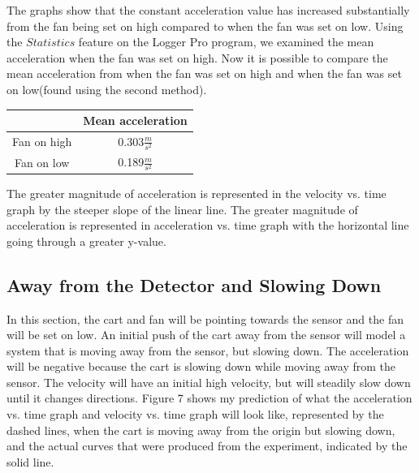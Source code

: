 \documentclass[aps,letterpaper,11pt]{revtex4}
\begin{document}
\newpage 

The graphs show that the constant acceleration value has increased substantially from the fan being set on high compared to when the fan was set on low. Using the $Statistics$ feature on the Logger Pro program, we examined the mean acceleration when the fan was set on high. Now it is possible to compare the mean acceleration from when the fan was set on high and when the fan was set on low(found using the second method).

\vspace{10mm}

\begin{center}
\begin{tabular}{|c|c|}
\hline
  & Mean acceleration\\
\hline
Fan on high & 0.303$\frac{m}{s^2}$\\
\hline
Fan on low & 0.189$\frac{m}{s^2}$\\
\hline  
\end{tabular}
\end{center}

\vspace{10mm}

The greater magnitude of acceleration is represented in the velocity vs. time graph by the steeper slope of the linear line. The greater magnitude of acceleration is represented in acceleration vs. time graph with the horizontal line going through a greater y-value.

\vspace{10mm
}
\subsection{Away from the Detector and Slowing Down} 

In this section, the cart and fan will be pointing towards the sensor and the fan will be set on low. An initial push of the cart away from the sensor will model a system that is moving away from the sensor, but slowing down. The acceleration will be negative because the cart is slowing down while moving away from the sensor. The velocity will have an initial high velocity, but will steadily slow down until it changes directions. Figure 7 shows my prediction of what the acceleration vs. time graph and velocity vs. time graph will look like, represented by the dashed lines, when the cart is moving away from the origin but slowing down, and the actual curves that were produced from the experiment, indicated by the solid line. 
\end{document}
